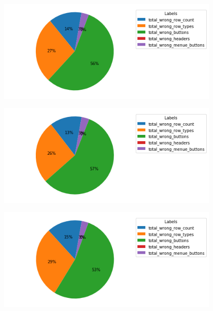 \documentclass[pdftex,a4paper,halfparskip, article]{scrartcl}
\begin{document}
\begin{figure}
\centering
\begin{minipage}{.5\textwidth}
  \centering
  \includegraphics[width=1\linewidth]{predictions_bin14_total_error_types_pie_chart}
  \label{fig:fehler_gesamt_bin14}
\end{minipage}%
\begin{minipage}{.5\textwidth}
  \centering
  \includegraphics[width=1\linewidth]{predictions_bin14_excluded_p80_error_types_pie_chart}
  \label{fig:fehler_beste80_bin14}
\end{minipage}
\begin{minipage}{.5\textwidth}
  \centering
   \includegraphics[width=1\linewidth]{predictions_bin14_p80_error_types_pie_chart}
  \label{fig:fehler_schlechteste20_bin14}
\end{minipage}
\end{figure}
\end{document}
